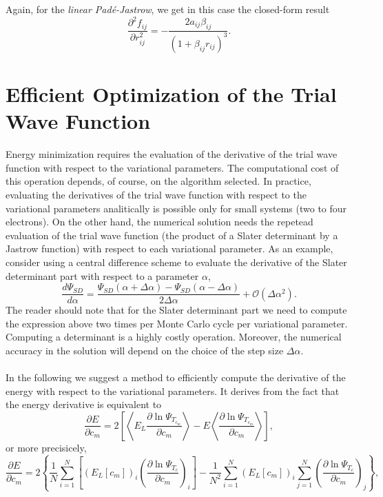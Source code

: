 Again, for the \emph{linear Pad\'e-Jastrow}, we get in this case the closed-form result
\begin{equation}\label{analyticalLinearPJLap}
\boxed{\frac{\partial^2 f_{ij}}{\partial r_{ij}^2} = - \frac{2 a_{ij} \beta_{ij} }{(1 + \beta_{ij} r_{ij})^3}}.
\end{equation}


\section{Efficient Optimization of the Trial Wave Function}\label{effParamDer}

Energy minimization requires the evaluation of the derivative of the trial wave function with respect to the variational parameters. The computational cost of this operation depends, of course, on the algorithm selected. In practice, evaluating the derivatives of the trial wave function with respect to the variational parameters analitically is possible only for small systems (two to four electrons). On the other hand, the numerical solution needs the repetead evaluation of the trial wave function (the product of a Slater determinant by a Jastrow function) with respect to each variational parameter. As an example, consider using a central difference scheme to evaluate the derivative of the Slater determinant part with respect to a parameter $\alpha$, 
$$\frac{d \Psi_{SD}}{d \alpha} = \frac{\Psi_{SD}(\alpha + \Delta \alpha) - \Psi_{SD}(\alpha - \Delta \alpha)}{2\Delta \alpha} + \mathcal{O}(\Delta \alpha^2).$$
The reader should note that for the Slater determinant part we need to compute the expression above two times per Monte Carlo cycle per variational parameter. Computing a determinant is a highly costly operation. Moreover, the numerical accuracy in the solution will depend on the choice of the step size $\Delta \alpha$.\\
\\
\noindent
In the following we suggest a method to efficiently compute the derivative of the energy with respect to the variational parameters. It derives from the fact that the energy derivative is equivalent to
$$
 \frac{\partial E}{\partial c_m} = 2\left[\left\langle E_L \frac{\partial \ln \Psi_{T_{c_m}}}{\partial c_m}\right\rangle - E \left\langle \frac{\partial \ln \Psi_{T_{c_m}}}{\partial c_m}\right\rangle \right],
$$
or more precisicely,
\begin{equation}
\boxed{\frac{\partial E}{\partial c_m}\! =\! 2\left\{\!\frac{1}{N} \sum_{i=1}^{N} \left[(E_L[c_m])_i \left(\frac{\partial \ln \Psi_{T_{c}}}{\partial c_m}\right)_i\right]\! -\! \frac{1}{N^2} \sum_{i=1}^{N} (E_L[c_m])_i \sum_{j=1}^{N} \left(\frac{\partial \ln \Psi_{T_{c}}}{\partial c_m}\right)_j\right\}\!},
\end{equation}
